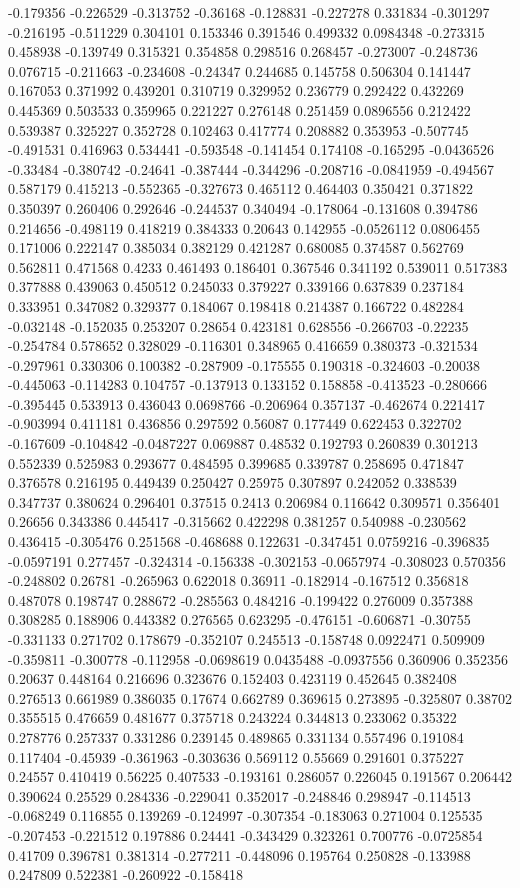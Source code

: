 -0.179356 -0.226529 -0.313752 -0.36168 -0.128831 -0.227278 0.331834 -0.301297 -0.216195 -0.511229 0.304101 0.153346 0.391546 0.499332 0.0984348 -0.273315 0.458938 -0.139749 0.315321 0.354858 0.298516 0.268457 -0.273007 -0.248736 0.076715 -0.211663 -0.234608 -0.24347 0.244685 0.145758 0.506304 0.141447 0.167053 0.371992 0.439201 0.310719 0.329952 0.236779 0.292422 0.432269 0.445369 0.503533 0.359965 0.221227 0.276148 0.251459 0.0896556 0.212422 0.539387 0.325227 0.352728 0.102463 0.417774 0.208882 0.353953 -0.507745 -0.491531 0.416963 0.534441 -0.593548 -0.141454 0.174108 -0.165295 -0.0436526 -0.33484 -0.380742 -0.24641 -0.387444 -0.344296 -0.208716 -0.0841959 -0.494567 0.587179 0.415213 -0.552365 -0.327673 0.465112 0.464403 0.350421 0.371822 0.350397 0.260406 0.292646 -0.244537 0.340494 -0.178064 -0.131608 0.394786 0.214656 -0.498119 0.418219 0.384333 0.20643 0.142955 -0.0526112 0.0806455 0.171006 0.222147 0.385034 0.382129 0.421287 0.680085 0.374587 0.562769 0.562811 0.471568 0.4233 0.461493 0.186401 0.367546 0.341192 0.539011 0.517383 0.377888 0.439063 0.450512 0.245033 0.379227 0.339166 0.637839 0.237184 0.333951 0.347082 0.329377 0.184067 0.198418 0.214387 0.166722 0.482284 -0.032148 -0.152035 0.253207 0.28654 0.423181 0.628556 -0.266703 -0.22235 -0.254784 0.578652 0.328029 -0.116301 0.348965 0.416659 0.380373 -0.321534 -0.297961 0.330306 0.100382 -0.287909 -0.175555 0.190318 -0.324603 -0.20038 -0.445063 -0.114283 0.104757 -0.137913 0.133152 0.158858 -0.413523 -0.280666 -0.395445 0.533913 0.436043 0.0698766 -0.206964 0.357137 -0.462674 0.221417 -0.903994 0.411181 0.436856 0.297592 0.56087 0.177449 0.622453 0.322702 -0.167609 -0.104842 -0.0487227 0.069887 0.48532 0.192793 0.260839 0.301213 0.552339 0.525983 0.293677 0.484595 0.399685 0.339787 0.258695 0.471847 0.376578 0.216195 0.449439 0.250427 0.25975 0.307897 0.242052 0.338539 0.347737 0.380624 0.296401 0.37515 0.2413 0.206984 0.116642 0.309571 0.356401 0.26656 0.343386 0.445417 -0.315662 0.422298 0.381257 0.540988 -0.230562 0.436415 -0.305476 0.251568 -0.468688 0.122631 -0.347451 0.0759216 -0.396835 -0.0597191 0.277457 -0.324314 -0.156338 -0.302153 -0.0657974 -0.308023 0.570356 -0.248802 0.26781 -0.265963 0.622018 0.36911 -0.182914 -0.167512 0.356818 0.487078 0.198747 0.288672 -0.285563 0.484216 -0.199422 0.276009 0.357388 0.308285 0.188906 0.443382 0.276565 0.623295 -0.476151 -0.606871 -0.30755 -0.331133 0.271702 0.178679 -0.352107 0.245513 -0.158748 0.0922471 0.509909 -0.359811 -0.300778 -0.112958 -0.0698619 0.0435488 -0.0937556 0.360906 0.352356 0.20637 0.448164 0.216696 0.323676 0.152403 0.423119 0.452645 0.382408 0.276513 0.661989 0.386035 0.17674 0.662789 0.369615 0.273895 -0.325807 0.38702 0.355515 0.476659 0.481677 0.375718 0.243224 0.344813 0.233062 0.35322 0.278776 0.257337 0.331286 0.239145 0.489865 0.331134 0.557496 0.191084 0.117404 -0.45939 -0.361963 -0.303636 0.569112 0.55669 0.291601 0.375227 0.24557 0.410419 0.56225 0.407533 -0.193161 0.286057 0.226045 0.191567 0.206442 0.390624 0.25529 0.284336 -0.229041 0.352017 -0.248846 0.298947 -0.114513 -0.068249 0.116855 0.139269 -0.124997 -0.307354 -0.183063 0.271004 0.125535 -0.207453 -0.221512 0.197886 0.24441 -0.343429 0.323261 0.700776 -0.0725854 0.41709 0.396781 0.381314 -0.277211 -0.448096 0.195764 0.250828 -0.133988 0.247809 0.522381 -0.260922 -0.158418 